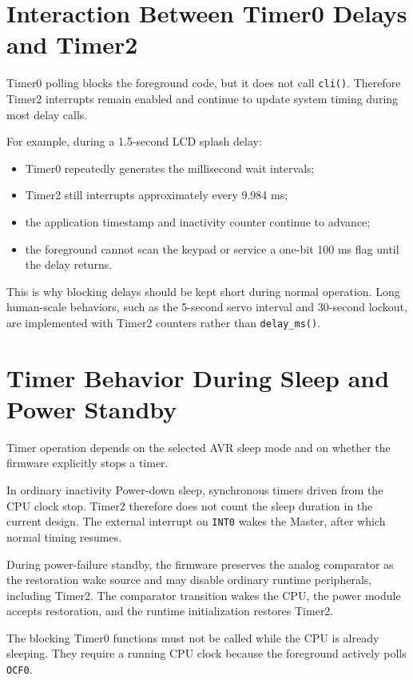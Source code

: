 \documentclass[11pt,a4paper]{article}
\begin{document}
\section{Interaction Between Timer0 Delays and Timer2}
Timer0 polling blocks the foreground code, but it does not call \texttt{cli()}. Therefore Timer2 interrupts remain enabled and continue to update system timing during most delay calls.

For example, during a 1.5-second LCD splash delay:
\begin{itemize}
  \item Timer0 repeatedly generates the millisecond wait intervals;
  \item Timer2 still interrupts approximately every 9.984 ms;
  \item the application timestamp and inactivity counter continue to advance;
  \item the foreground cannot scan the keypad or service a one-bit 100 ms flag until the delay returns.
\end{itemize}

This is why blocking delays should be kept short during normal operation. Long human-scale behaviors, such as the 5-second servo interval and 30-second lockout, are implemented with Timer2 counters rather than \texttt{delay\_ms()}.

\section{Timer Behavior During Sleep and Power Standby}
Timer operation depends on the selected AVR sleep mode and on whether the firmware explicitly stops a timer.

In ordinary inactivity Power-down sleep, synchronous timers driven from the CPU clock stop. Timer2 therefore does not count the sleep duration in the current design. The external interrupt on \texttt{INT0} wakes the Master, after which normal timing resumes.

During power-failure standby, the firmware preserves the analog comparator as the restoration wake source and may disable ordinary runtime peripherals, including Timer2. The comparator transition wakes the CPU, the power module accepts restoration, and the runtime initialization restores Timer2.

The blocking Timer0 functions must not be called while the CPU is already sleeping. They require a running CPU clock because the foreground actively polls \texttt{OCF0}.
\end{document}
